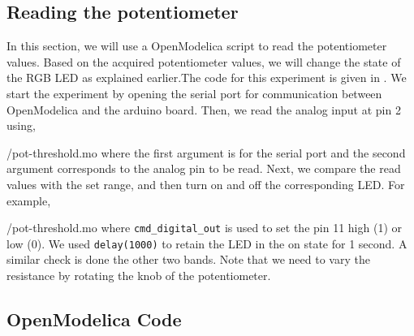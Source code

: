 \subsection{Reading the potentiometer}
In this section, we will use a OpenModelica script to read the potentiometer values.  Based on the acquired potentiometer values, we will change the state of the RGB LED as explained earlier.The code for this experiment is given in
. We start the experiment by opening the serial port for communication between OpenModelica and the arduino board. Then, we read the analog input at pin 2 using,

{\LocPotOpenModelicacode/pot-threshold.mo} where the first argument is for
the serial port and the second argument corresponds to the analog pin to be read.  Next, we compare the read values with the set range, and then turn on and off the corresponding LED. For example, 

{\LocPotOpenModelicacode/pot-threshold.mo} where {\tt cmd\_digital\_out} is used to set the pin 11 high (1) or low (0). We used {\tt delay(1000)} to retain the LED in the on state for 1 second.  A similar check is done the other two bands. Note that we need to vary the resistance by rotating the knob of the potentiometer.

\subsection{OpenModelica Code}
\label{sec:pot-OpenModelica-code}
\begin{OpenModelicacode}
\label{OpenModelica:pot-100}

\end{OpenModelicacode}
